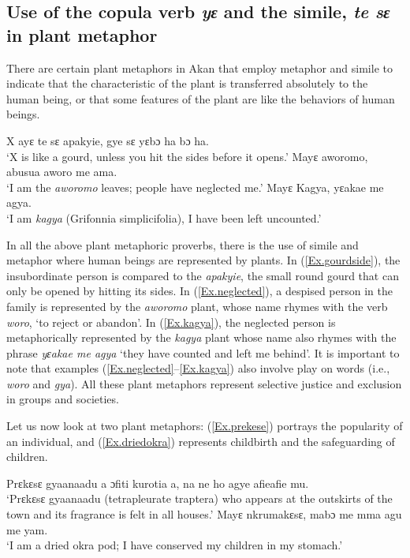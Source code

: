 \documentclass[output=paper,colorlinks,citecolor=brown]{langscibook}
\begin{document}
\subsection{Use of the copula verb \textit{yɛ} and the simile, \textit{te sɛ} in plant metaphor}

There are certain plant metaphors in Akan that employ metaphor and simile to indicate that the characteristic of the plant is transferred absolutely to the human being, or that some features of the plant are like the behaviors of human beings.

\ea \label{Ex.gourdside}
\gl X ayɛ te sɛ apakyie, gye sɛ yɛbɔ ha bɔ ha.\\
\glt  ‘X is like a gourd, unless you hit the sides before it opens.'
\ex \label{Ex.neglected}
\gl Mayɛ aworomo, abusua aworo me ama.\\
\glt  ‘I am the \textit{aworomo} leaves; people have neglected me.'
\ex \label{Ex.kagya}
\gl Mayɛ Kagya, yɛakae me agya.\\
\glt  ‘I am \textit{kagya} (Grifonnia simplicifolia), I have been left uncounted.'
\z

In all the above plant metaphoric proverbs, there is the use of simile and metaphor where human beings are represented by plants. In (\ref{Ex.gourdside}), the insubordinate person is compared to the \textit{apakyie}, the small round gourd that can only be opened by hitting its sides. In (\ref{Ex.neglected}), a despised person in the family is represented by the \textit{aworomo} plant, whose name rhymes with the verb \textit{woro}, `to reject or abandon'. In (\ref{Ex.kagya}), the neglected person is metaphorically represented by the \textit{kagya} plant whose name also rhymes with the phrase \textit{yɛakae me agya} `they have counted and left me behind'. It is important to note that examples (\ref{Ex.neglected}--\ref{Ex.kagya}) also involve play on words (i.e., \textit{woro} and \textit{gya}). All these plant metaphors represent selective justice and exclusion in groups and societies.

Let us now look at two plant metaphors: (\ref{Ex.prekese}) portrays the popularity of an individual, and (\ref{Ex.driedokra}) represents childbirth and the safeguarding of children.

\ea \label{Ex.prekese}
\gl Prɛkɛsɛ gyaanaadu a ɔfiti kurotia a, na ne ho agye afieafie mu.\\
\glt  ‘Prɛkɛsɛ gyaanaadu (tetrapleurate traptera) who appears at the outskirts of the town and its fragrance is felt in all houses.'
\ex \label{Ex.driedokra}
\gl Mayɛ nkrumakɛsɛ, mabɔ me mma agu me yam.\\
\glt  ‘I am a dried okra pod; I have conserved my children in my stomach.'
\z
\end{document}
